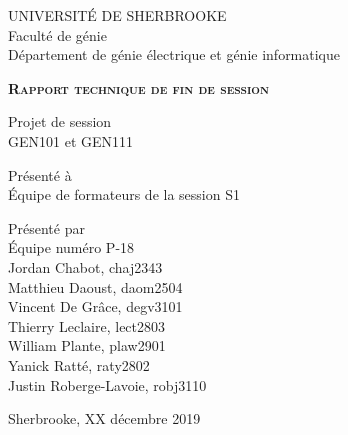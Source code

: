 \begin{titlepage}
    \centering
    UNIVERSITÉ DE SHERBROOKE\\
    Faculté de génie\\
    Département de génie électrique et génie informatique

    \vfill

    {\LARGE \bfseries \scshape Rapport technique de fin de session}

    \vfill

    Projet de session\\
    GEN101 et GEN111

    \vfill
    
    Présenté à\\
    Équipe de formateurs de la session S1

    \vfill

    Présenté par\\
    Équipe numéro P-18\\
    Jordan Chabot, chaj2343\\
    Matthieu Daoust, daom2504\\
    Vincent De Grâce, degv3101\\
    Thierry Leclaire, lect2803\\
    William Plante, plaw2901\\
    Yanick Ratté, raty2802\\
    Justin Roberge-Lavoie, robj3110

    \vfill

    Sherbrooke,  XX décembre 2019
\end{titlepage}
